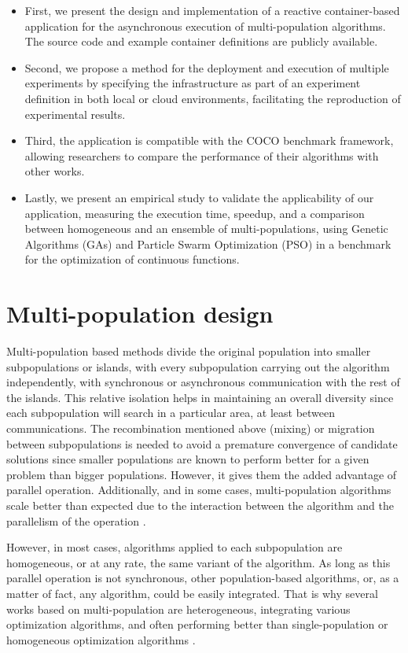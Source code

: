 \documentclass[review]{elsarticle}
\begin{document}
\begin{itemize}
    \item First, we present the design and implementation of a reactive 
    container-based application for the asynchronous execution of multi-population 
    algorithms. The source code and example container definitions are publicly available.
    \item Second, we propose a method for the deployment and execution of 
    multiple experiments by specifying the infrastructure as part of an 
    experiment definition in both local or cloud environments,
    facilitating the reproduction of experimental results.
    \item Third, the application is compatible with the COCO benchmark 
    framework, allowing researchers to compare the performance of their 
    algorithms with other works.
    \item Lastly, we present an empirical study to validate the 
    applicability of our application,  measuring the execution time, 
    speedup, and a comparison between homogeneous and an ensemble of 
    multi-populations, using Genetic Algorithms (GAs) and Particle 
    Swarm Optimization (PSO) in a benchmark for the optimization of 
    continuous functions.
\end{itemize}


\section{Multi-population design}

Multi-population based methods divide the original population into
smaller subpopulations or islands, with every subpopulation carrying out the
algorithm independently, with synchronous or asynchronous communication with the
rest of the islands. This relative isolation helps in maintaining an overall
diversity since each subpopulation will search in a particular area, at least
between communications. The recombination mentioned above (mixing) or migration
between subpopulations is needed to avoid a premature convergence of candidate
solutions since smaller populations are known to perform better for a given
problem than bigger populations. However, it gives them the added advantage of
parallel operation. Additionally, and in some cases, multi-population algorithms
scale better than expected due to the interaction between the algorithm and the
parallelism of the operation \cite{ALBA20027}.

However, in most cases, algorithms applied to each subpopulation are
homogeneous, or at any rate, the same variant of the algorithm. As long as this
parallel operation is not synchronous, other population-based algorithms, or, as
a matter of fact, any algorithm, could be easily integrated. That is why several
works based on multi-population are heterogeneous, integrating various
optimization algorithms, and often performing better than single-population or
homogeneous optimization algorithms \cite{wu2016differential,nseef2016adaptive}.
\end{document}
